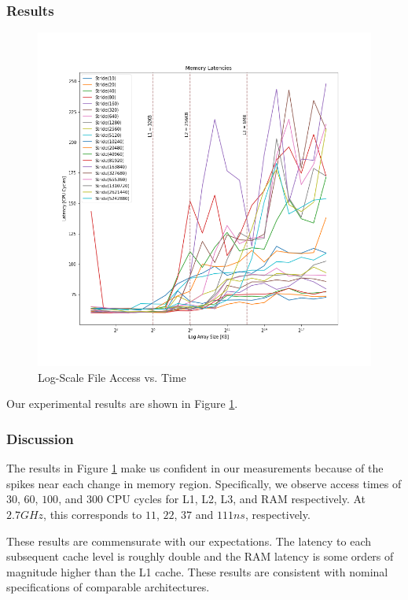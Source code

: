 \documentclass[sigconf]{acmart}
\begin{document}
\subsubsection{Results}
\begin{figure}[h!]
\includegraphics[scale=0.33]{images/Memory_Latencies.png}
\caption{Log-Scale File Access vs. Time}
\label{memoryLatency}
\end{figure}
Our experimental results are shown in Figure \ref{memoryLatency}.

\subsubsection{Discussion}
The results in Figure \ref{memoryLatency} make us confident in our measurements because of the spikes near each change in memory region. Specifically, we observe access times of $30$, $60$, $100$, and $300$ CPU cycles for L1, L2, L3, and RAM respectively. At $2.7GHz$, this corresponds to $11$, $22$, $37$ and $111ns$, respectively.

These results are commensurate with our expectations. The latency to each subsequent cache level is roughly double and the RAM latency is some orders of magnitude higher than the L1 cache. These results are consistent with nominal specifications of comparable architectures.
\end{document}
